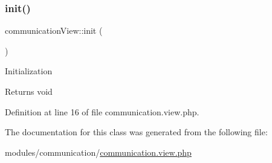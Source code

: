 \hypertarget{classcommunicationView_abf9303274b2b073771fa7564247b160c}{}\label{classcommunicationView_abf9303274b2b073771fa7564247b160c} 
\subsubsection{\texorpdfstring{init()}{init()}}
{\footnotesize\ttfamily communication\+View\+::init (\begin{DoxyParamCaption}{ }\end{DoxyParamCaption})}

Initialization \begin{DoxyReturn}{Returns}
void 
\end{DoxyReturn}


Definition at line 16 of file communication.\+view.\+php.



The documentation for this class was generated from the following file\+:\begin{DoxyCompactItemize}
\item 
modules/communication/\hyperlink{communication_8view_8php}{communication.\+view.\+php}\end{DoxyCompactItemize}
